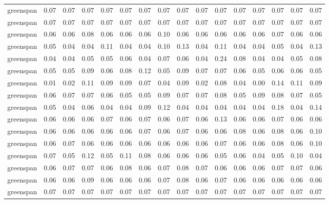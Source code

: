 \begin{tabular}{lrrrrrrrrrrrrrrr}
 greenspan & 0.07 & 0.07 & 0.07 & 0.07 & 0.07 & 0.07 & 0.07 & 0.07 & 0.07 &  0.07 &  0.07 &  0.07 &  0.07 &  0.07 &  0.07 \\
 greenspan & 0.07 & 0.07 & 0.07 & 0.07 & 0.07 & 0.07 & 0.07 & 0.07 & 0.07 &  0.07 &  0.07 &  0.07 &  0.07 &  0.07 &  0.07 \\
 greenspan & 0.06 & 0.06 & 0.08 & 0.06 & 0.06 & 0.06 & 0.10 & 0.06 & 0.06 &  0.06 &  0.06 &  0.06 &  0.07 &  0.06 &  0.06 \\
 greenspan & 0.05 & 0.04 & 0.04 & 0.11 & 0.04 & 0.04 & 0.10 & 0.13 & 0.04 &  0.11 &  0.04 &  0.04 &  0.05 &  0.04 &  0.13 \\
 greenspan & 0.04 & 0.04 & 0.05 & 0.05 & 0.06 & 0.04 & 0.07 & 0.06 & 0.04 &  0.24 &  0.08 &  0.04 &  0.04 &  0.05 &  0.08 \\
 greenspan & 0.05 & 0.05 & 0.09 & 0.06 & 0.08 & 0.12 & 0.05 & 0.09 & 0.07 &  0.07 &  0.06 &  0.05 &  0.06 &  0.06 &  0.05 \\
 greenspan & 0.01 & 0.02 & 0.11 & 0.09 & 0.09 & 0.07 & 0.04 & 0.09 & 0.02 &  0.08 &  0.04 &  0.00 &  0.14 &  0.11 &  0.09 \\
 greenspan & 0.06 & 0.07 & 0.07 & 0.06 & 0.05 & 0.05 & 0.09 & 0.07 & 0.07 &  0.08 &  0.05 &  0.09 &  0.08 &  0.07 &  0.05 \\
 greenspan & 0.05 & 0.04 & 0.06 & 0.04 & 0.04 & 0.09 & 0.12 & 0.04 & 0.04 &  0.04 &  0.04 &  0.04 &  0.18 &  0.04 &  0.14 \\
 greenspan & 0.06 & 0.06 & 0.06 & 0.07 & 0.06 & 0.07 & 0.06 & 0.07 & 0.06 &  0.13 &  0.06 &  0.06 &  0.07 &  0.06 &  0.06 \\
 greenspan & 0.06 & 0.06 & 0.06 & 0.06 & 0.06 & 0.07 & 0.06 & 0.07 & 0.06 &  0.06 &  0.08 &  0.06 &  0.08 &  0.06 &  0.10 \\
 greenspan & 0.06 & 0.07 & 0.06 & 0.06 & 0.06 & 0.06 & 0.06 & 0.06 & 0.06 &  0.07 &  0.06 &  0.06 &  0.08 &  0.06 &  0.10 \\
 greenspan & 0.07 & 0.05 & 0.12 & 0.05 & 0.11 & 0.08 & 0.06 & 0.06 & 0.06 &  0.05 &  0.06 &  0.04 &  0.05 &  0.10 &  0.04 \\
 greenspan & 0.06 & 0.07 & 0.07 & 0.06 & 0.08 & 0.06 & 0.07 & 0.08 & 0.07 &  0.06 &  0.06 &  0.06 &  0.07 &  0.07 &  0.06 \\
 greenspan & 0.06 & 0.06 & 0.09 & 0.06 & 0.06 & 0.06 & 0.07 & 0.08 & 0.06 &  0.07 &  0.06 &  0.06 &  0.06 &  0.06 &  0.06 \\
 greenspan & 0.07 & 0.07 & 0.07 & 0.07 & 0.07 & 0.07 & 0.07 & 0.07 & 0.07 &  0.07 &  0.07 &  0.07 &  0.07 &  0.07 &  0.07 \\

\end{tabular}
